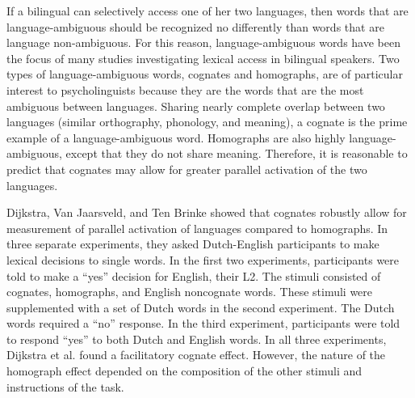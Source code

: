 If a bilingual can selectively access one of her two languages, then words that are language-ambiguous should be recognized no differently than words that are language non-ambiguous. For this reason, language-ambiguous words have been the focus of many studies investigating lexical access in bilingual speakers. Two types of language-ambiguous words, cognates and homographs, are of particular interest to psycholinguists because they are the words that are the most ambiguous between languages. Sharing nearly complete overlap between two languages (similar orthography, phonology, and meaning), a cognate is the prime example of a language-ambiguous word. Homographs are also highly language-ambiguous, except that they do not share meaning. Therefore, it is reasonable to predict that cognates may allow for greater parallel activation of the two languages.

Dijkstra, Van Jaarsveld, and Ten Brinke  showed that cognates robustly allow for measurement of parallel activation of languages compared to homographs. In three separate experiments, they asked Dutch-English participants to make lexical decisions to single words. In the first two experiments, participants were told to make a ``yes'' decision for English, their L2. The  stimuli consisted of cognates, homographs, and English noncognate words. These stimuli were supplemented with a set of Dutch words in the second experiment. The Dutch words required a ``no'' response. In the third experiment, participants were told to respond ``yes'' to both Dutch and English words. In all three experiments, Dijkstra et al. found a facilitatory cognate effect. However, the nature of the homograph effect depended on the composition of the other stimuli and instructions of the task. 


